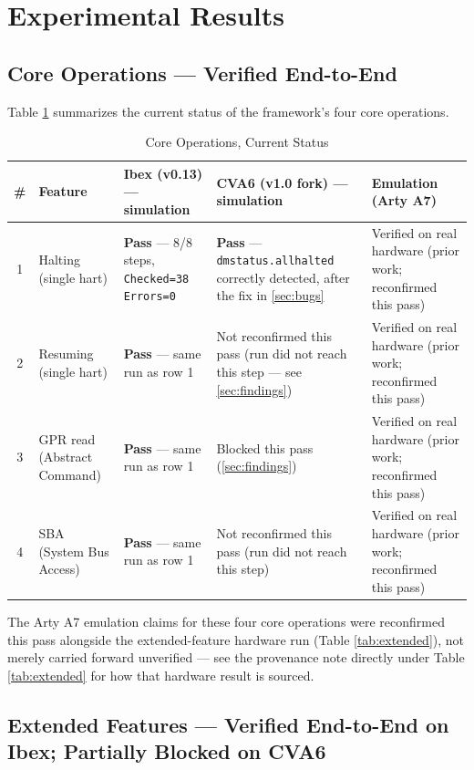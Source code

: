 \documentclass[conference]{IEEEtran}
\begin{document}
\section{Experimental Results}
\label{sec:results}

\subsection{Core Operations --- Verified End-to-End}

Table \ref{tab:core} summarizes the current status of the framework's four core operations.

\begin{table}[htbp]
\caption{Core Operations, Current Status}
\label{tab:core}
\centering
\begin{tabularx}{\textwidth}{@{}clXXX@{}}
\toprule
\textbf{\#} & \textbf{Feature} & \textbf{Ibex (v0.13) --- simulation} & \textbf{CVA6 (v1.0 fork) --- simulation} & \textbf{Emulation (Arty A7)} \\
\midrule
1 & Halting (single hart) & \textbf{Pass} --- 8/8 steps, \texttt{Checked=38 Errors=0} & \textbf{Pass} --- \texttt{dmstatus.allhalted} correctly detected, after the fix in \ref{sec:bugs} & Verified on real hardware (prior work; reconfirmed this pass) \\
2 & Resuming (single hart) & \textbf{Pass} --- same run as row 1 & Not reconfirmed this pass (run did not reach this step --- see \ref{sec:findings}) & Verified on real hardware (prior work; reconfirmed this pass) \\
3 & GPR read (Abstract Command) & \textbf{Pass} --- same run as row 1 & Blocked this pass (\ref{sec:findings}) & Verified on real hardware (prior work; reconfirmed this pass) \\
4 & SBA (System Bus Access) & \textbf{Pass} --- same run as row 1 & Not reconfirmed this pass (run did not reach this step) & Verified on real hardware (prior work; reconfirmed this pass) \\
\bottomrule
\end{tabularx}
\end{table}

The Arty A7 emulation claims for these four core operations were reconfirmed this pass alongside the extended-feature hardware run (Table \ref{tab:extended}), not merely carried forward unverified --- see the provenance note directly under Table \ref{tab:extended} for how that hardware result is sourced.

\subsection{Extended Features --- Verified End-to-End on Ibex; Partially Blocked on CVA6}
\end{document}
